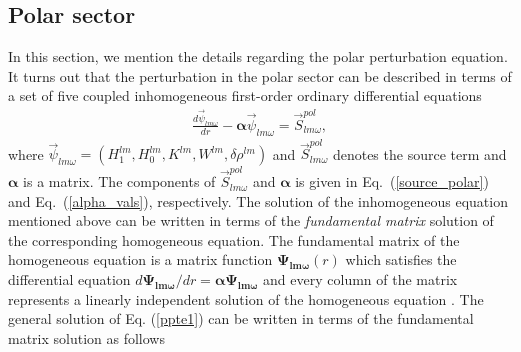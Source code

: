 \documentclass[11pt]{article}
\begin{document}
\subsection{Polar sector}
 In this section, we mention the details regarding the polar perturbation equation. It turns out that the perturbation in the polar sector can be described in terms of a set of five coupled inhomogeneous first-order ordinary differential equations %
\begin{align}\label{ppte1}
  \frac{d\vec{\psi}_{lm\omega}}{dr}-\boldsymbol{\alpha}\vec{\psi}_{lm\omega}=\vec S^{pol}_{lm\omega} ,
\end{align}
where $\vec{\psi}_{lm\omega}=(H_1^{lm}, H_0^{lm}, K^{lm}, W^{lm},\delta\rho^{lm})$ and $\vec S^{pol}_{lm\omega}$ denotes the source term and $\boldsymbol{\alpha}$ is a matrix. The components of $\vec S^{pol}_{lm\omega}$ and $\boldsymbol{\alpha}$ is given in Eq.~(\ref{source_polar}) and 
Eq.~(\ref{alpha_vals}), respectively. The solution of the inhomogeneous equation mentioned above can be written in terms of the \textit{fundamental matrix} solution of the corresponding homogeneous equation. The fundamental matrix of the homogeneous equation is a matrix function $\boldsymbol{\Psi_{lm\omega}}(r)$ which satisfies the differential equation  $d\boldsymbol{\Psi_{lm\omega}}/dr=\boldsymbol{\alpha}\boldsymbol{\Psi_{lm\omega}} $ and every column of the matrix represents a linearly independent solution of the homogeneous equation \cite{wasow1965asymptotic}. The general solution of Eq. (\ref{ppte1}) can be written in terms of the fundamental matrix solution as follows \cite{wasow1965asymptotic}
\end{document}
